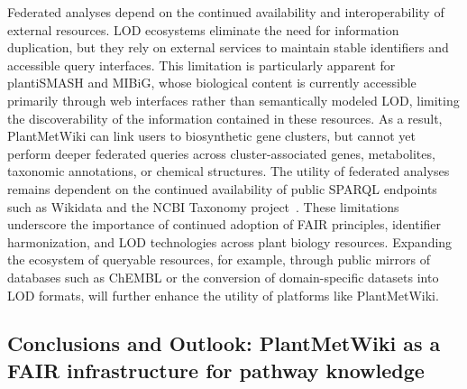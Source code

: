 \documentclass[11pt,a4paper]{article}
\begin{document}
Federated analyses depend on the continued availability and interoperability of external resources.
LOD ecosystems eliminate the need for information duplication, but they rely on external services to maintain
stable identifiers and accessible query interfaces. This limitation is particularly apparent for
plantiSMASH and MIBiG, whose biological content is currently accessible primarily through web
interfaces rather than semantically modeled LOD, limiting the discoverability of the information
contained in these resources. As a result, PlantMetWiki can link users to biosynthetic gene clusters,
but cannot yet perform deeper federated queries across cluster-associated genes, metabolites,
taxonomic annotations, or chemical structures. The utility of federated analyses remains dependent on
the continued availability of public SPARQL endpoints such as Wikidata and the NCBI Taxonomy
project~\cite{federhen2012}. These limitations underscore the importance of continued adoption of FAIR
principles, identifier harmonization, and LOD technologies across plant biology resources. Expanding
the ecosystem of queryable resources, for example, through public mirrors of databases such as ChEMBL
or the conversion of domain-specific datasets into LOD formats, will further enhance the utility of platforms like PlantMetWiki.

\subsection*{Conclusions and Outlook: PlantMetWiki as a FAIR infrastructure for pathway knowledge}
\end{document}
